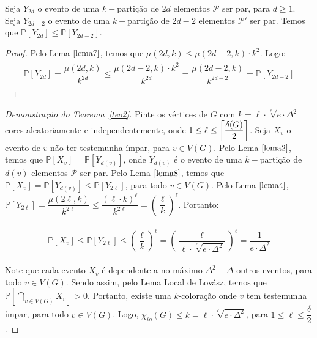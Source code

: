 \documentclass[12pt]{article}
\begin{document}
{\begin{lema}  
	\label{lema8} 
	Seja $Y_{2d}$ o evento de uma $k-$partição de $2d$ elementos $\mathcal{P}$ ser par, para $d \geq 1$. Seja $Y_{2d-2}$ o evento de uma $k-$partição de $2d - 2$ elementos $\mathcal{P'}$ ser par. Temos que $\mathds{P}[Y_{2d}] \leq \mathds{P}[Y_{2d-2}]$.
\end{lema}
 
\begin{proof} 
	Pelo Lema $\ref{lema7}$, temos que $\mu(2d, k) \leq \mu(2d - 2, k) {\cdot} k^{2}$. Logo:  
	\begin{align}
		\begin{split}
		  \mathds{P}[Y_{2d}] = \dfrac{\mu(2d, k)}{k^{2d}} \leq \dfrac{\mu(2d - 2, k) {\cdot} k^{2}}{k^{2d}} = \dfrac{\mu(2d - 2, k)}{k^{2d-2}} = \mathds{P}[Y_{2d-2}]
		\end{split} 
	\end{align}
	 
\end{proof}\newl 

 
\begin{proof}[Demonstração do Teorema~\ref{teo2}]
	Pinte os vértices de $G$ com $k = \ell {\cdot} \sqrt[\ell]{e {\cdot} \Delta^2}$ cores aleatoriamente e independentemente, onde $1 \leq \ell \leq \left \lceil \dfrac{\delta(G)}{2} \right \rceil$. Seja $X_{v}$ o evento de $v$ não ter testemunha ímpar, para $v \in V(G)$. Pelo Lema $\ref{lema2}$, temos que $\mathds{P}[X_v] = \mathds{P}[Y_{d(v)}]$, onde $Y_{d(v)}$ é o evento de uma $k-$partição de $d(v)$ elementos $\mathcal{P}$ ser par. Pelo Lema $\ref{lema8}$, temos que $\mathds{P}[X_v] = \mathds{P}[Y_{d(v)}] \leq \mathds{P}[Y_{2\ell}]$, para todo $v \in V(G)$. Pelo Lema $\ref{lema4}$,  $\mathds{P}[Y_{2\ell}] =\dfrac{\mu(2\ell, k)}{k^{2\ell}} \leq \dfrac{(\ell {\cdot} k)^\ell}{k^{2\ell}} = \left(\dfrac{\ell}{k}\right)^\ell$. Portanto: 
	
	\begin{align}
		\begin{split}
			\mathds{P}[X_{v}] \leq \mathds{P}[Y_{2\ell}] \leq \left(\dfrac{\ell}{k}\right)^\ell = \left(\dfrac{\ell}{\ell {\cdot} \sqrt[\ell]{e {\cdot} \Delta^2}}\right)^\ell = \dfrac{1}{e {\cdot} \Delta^2}
		\end{split} 
	\end{align}
	
	Note que cada evento $X_v$ é dependente a no máximo $\Delta^2 - \Delta$ outros eventos, para todo $v \in V(G)$. Sendo assim, pelo Lema Local de Lovász, temos que $\mathds{P}[\bigcap\limits_{v \in V(G)} \overline{X_{v}} ] > 0$. Portanto, existe uma $k$-coloração onde $v$ tem testemunha ímpar, para todo $v \in V(G)$. Logo, $\chi_{io}(G) \leq k = \ell {\cdot} \sqrt[\ell]{e {\cdot} \Delta^2}$, para $1 \leq \ell \leq \dfrac{\delta}{2}$.
	
\end{proof}\newpage
}
  
\end{document}

